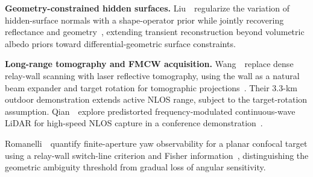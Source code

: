 \vspace{0.8mm}
\noindent \textbf{Geometry-constrained hidden surfaces.}
Liu~\etal~regularize the variation of hidden-surface normals with a shape-operator prior while jointly recovering reflectance and geometry~\cite{liuGeometryConstrainedNLOS2026}, extending transient reconstruction beyond volumetric albedo priors toward differential-geometric surface constraints.

\vspace{0.8mm}
\noindent \textbf{Long-range tomography and FMCW acquisition.}
Wang~\etal~replace dense relay-wall scanning with laser reflective tomography, using the wall as a natural beam expander and target rotation for tomographic projections~\cite{wangLRTNLOS2026}. Their 3.3-km outdoor demonstration extends active NLOS range, subject to the target-rotation assumption. Qian~\etal~explore predistorted frequency-modulated continuous-wave LiDAR for high-speed NLOS capture in a conference demonstration~\cite{qianHighSpeedNLOSFMCW2026}.

Romanelli~\etal~quantify finite-aperture yaw observability for a planar confocal target using a relay-wall switch-line criterion and Fisher information~\cite{romanelliFiniteApertureNLOS2026}, distinguishing the geometric ambiguity threshold from gradual loss of angular sensitivity.
